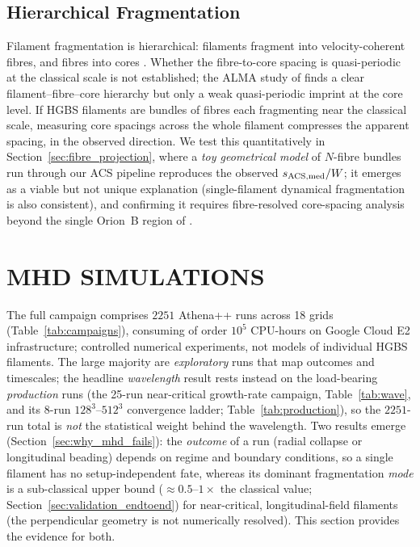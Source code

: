 \documentclass[usenatbib,twoside,twocolumn]{mnras}
\begin{document}
\subsection{Hierarchical Fragmentation}

Filament fragmentation is hierarchical: filaments fragment into velocity-coherent fibres, and fibres into cores \citep{Hacar2013,Hacar2018,Yang2024}. Whether the fibre-to-core spacing is quasi-periodic at the classical scale is not established; the ALMA study of \citet{Yang2024} finds a clear filament--fibre--core hierarchy but only a weak quasi-periodic imprint at the core level. If HGBS filaments are bundles of fibres each fragmenting near the classical scale, measuring core spacings across the whole filament compresses the apparent spacing, in the observed direction. We test this quantitatively in Section~\ref{sec:fibre_projection}, where a \emph{toy geometrical model} of $N$-fibre bundles run through our ACS pipeline reproduces the observed $s_{\rm ACS,med}/W$; it emerges as a viable but not unique explanation (single-filament dynamical fragmentation is also consistent), and confirming it requires fibre-resolved core-spacing analysis beyond the single Orion~B region of \citet{Yang2024}.

\section{MHD SIMULATIONS}

The full campaign comprises $2251$ Athena++ runs across 18 grids (Table~\ref{tab:campaigns}), consuming of order $10^5$ CPU-hours on Google Cloud E2 infrastructure; controlled numerical experiments, not models of individual HGBS filaments. The large majority are \emph{exploratory} runs that map outcomes and timescales; the headline \emph{wavelength} result rests instead on the load-bearing \emph{production} runs (the 25-run near-critical growth-rate campaign, Table~\ref{tab:wave}, and its 8-run $128^3$--$512^3$ convergence ladder; Table~\ref{tab:production}), so the $2251$-run total is \emph{not} the statistical weight behind the wavelength. Two results emerge (Section~\ref{sec:why_mhd_fails}): the \emph{outcome} of a run (radial collapse or longitudinal beading) depends on regime and boundary conditions, so a single filament has no setup-independent fate, whereas its dominant fragmentation \emph{mode} is a sub-classical upper bound ($\approx0.5$--$1\times$ the classical value; Section~\ref{sec:validation_endtoend}) for near-critical, longitudinal-field filaments (the perpendicular geometry is not numerically resolved). This section provides the evidence for both.
\end{document}
